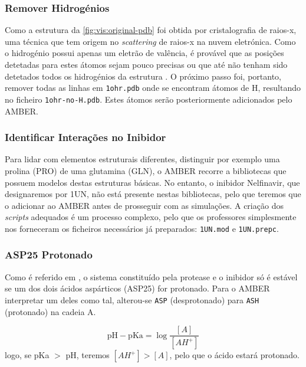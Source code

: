 \documentclass[12pt,a4paper]{article}
\begin{document}
\subsubsection{Remover Hidrogénios}
	Como a estrutura da \cref{fig:vis:original-pdb} foi obtida por cristalografia de raios-x, uma técnica que tem origem no \textit{scattering} de raios-x na nuvem eletrónica. Como o hidrogénio possui apenas um eletrão de valência, é provável que as posições detetadas para estes átomos sejam pouco precisas ou que até não tenham sido detetados todos os hidrogénios da estrutura \cite{woinskaHydrogenAtomsCan2016}. O próximo passo foi, portanto, remover todas as linhas em \verb|1ohr.pdb| onde se encontram átomos de H, resultando no ficheiro \verb|1ohr-no-H.pdb|. Estes átomos serão posteriormente adicionados pelo AMBER.

\subsubsection{Identificar Interações no Inibidor}\label{sec:vis:inibidor}
	Para lidar com elementos estruturais diferentes, distinguir por exemplo uma prolina (PRO) de uma glutamina (GLN), o AMBER recorre a bibliotecas que possuem modelos destas estruturas básicas. No entanto, o inibidor Nelfinavir, que designaremos por 1UN, não está presente nestas bibliotecas, pelo que teremos que o adicionar ao AMBER antes de prosseguir com as simulações. A criação dos \textit{scripts} adequados é um processo complexo, pelo que os professores simplesmente nos forneceram os ficheiros necessários já preparados: \verb|1UN.mod| e \verb|1UN.prepc|.
	
\subsubsection{ASP25 Protonado}
	Como é referido em \cite{UnravelingHIVProtease,soaresDatasetShowingImpact2016,perezSubstrateRecognitionHIV12010}, o sistema constituído pela protease e o inibidor só é estável se um dos dois ácidos aspárticos (ASP25) for protonado. Para o AMBER interpretar um deles como tal, alterou-se \verb|ASP| (desprotonado) para \verb|ASH| (protonado) na cadeia A.
	
	\begin{equation}
		\mathrm{pH} - \mathrm{pKa} = \log\dfrac{\left[A\right]}
		{\left[AH^+\right]}
	\end{equation}
	logo, se pKa $>$ pH, teremos $\left[AH^+\right] > \left[A\right]$, pelo que o ácido estará protonado. 
	
\end{document}
